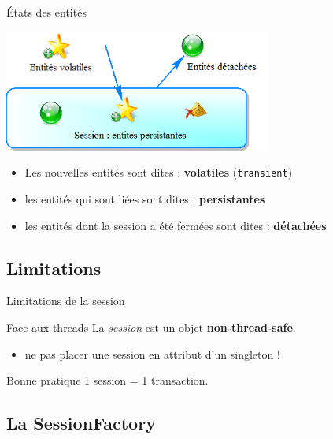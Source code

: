 \documentclass[compress]{beamer}%
\begin{document}
\begin{frame}{États des entités}
	
	\begin{center}
	\includegraphics[height=4cm]{images/entities_states.png}	
	\end{center}
	
	\pause
	\begin{itemize}[<+->]
	\item Les nouvelles entités sont dites : \textbf{volatiles} (\texttt{transient})
	\item les entités qui sont liées sont dites : \textbf{persistantes}
	\item les entités dont la session a été fermées sont dites : \textbf{détachées}
	\end{itemize}

\end{frame}


\subsection{Limitations}
\begin{frame}{Limitations de la session}
	\begin{alertblock}{Face aux threads}
	La \emph{session} est un objet \textbf{non-thread-safe}.
	\end{alertblock}

	\pause
	\begin{itemize}
		\item ne pas placer une session en attribut d'un singleton !
	\end{itemize}

	
	\pause
	\begin{block}{Bonne pratique}
	1 session = 1 transaction.
	\end{block}
	
\end{frame}



\subsection{La SessionFactory}
\end{document}
